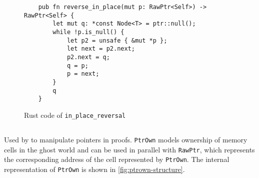 \documentclass[11pt,a4paper]{article}
\begin{document}
\begin{figure}[tp]
    \begin{verbatim}
    pub fn reverse_in_place(mut p: RawPtr<Self>) -> RawPtr<Self> {
        let mut q: *const Node<T> = ptr::null();
        while !p.is_null() {
            let p2 = unsafe { &mut *p };
            let next = p2.next;
            p2.next = q;
            q = p;
            p = next;
        }
        q
    }
    \end{verbatim}
\caption{Rust code of \texttt{in\_place\_reversal}}
\label{fig:reversalinp}
\end{figure}


\subsection{}
\subsubsection{} Used by \creusot{} to manipulate pointers in proofs. \texttt{PtrOwn} models ownership of memory cells in the ghost world and can be used in parallel with \texttt{RawPtr}, which represents the corresponding address of the cell represented by \texttt{PtrOwn}. The internal representation of \texttt{PtrOwn} is shown in \autoref{fig:ptrown-structure}.
\end{document}
